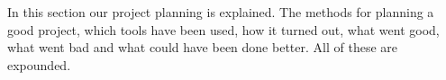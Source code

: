 In this section our project planning is explained. The methods for planning a good project, which tools have been used, how it turned out, what went good, what went bad and what could have been done better. All of these are expounded.